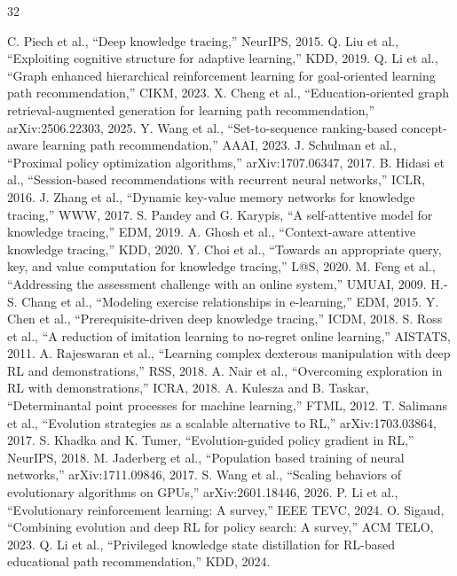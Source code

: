 \documentclass[11pt,a4paper]{article}
\begin{document}

\begin{thebibliography}{32}

 C. Piech et al., ``Deep knowledge tracing,'' NeurIPS, 2015.
 Q. Liu et al., ``Exploiting cognitive structure for adaptive learning,'' KDD, 2019.
 Q. Li et al., ``Graph enhanced hierarchical reinforcement learning for goal-oriented learning path recommendation,'' CIKM, 2023.
 X. Cheng et al., ``Education-oriented graph retrieval-augmented generation for learning path recommendation,'' arXiv:2506.22303, 2025.
 Y. Wang et al., ``Set-to-sequence ranking-based concept-aware learning path recommendation,'' AAAI, 2023.
 J. Schulman et al., ``Proximal policy optimization algorithms,'' arXiv:1707.06347, 2017.
 B. Hidasi et al., ``Session-based recommendations with recurrent neural networks,'' ICLR, 2016.
 J. Zhang et al., ``Dynamic key-value memory networks for knowledge tracing,'' WWW, 2017.
 S. Pandey and G. Karypis, ``A self-attentive model for knowledge tracing,'' EDM, 2019.
 A. Ghosh et al., ``Context-aware attentive knowledge tracing,'' KDD, 2020.
 Y. Choi et al., ``Towards an appropriate query, key, and value computation for knowledge tracing,'' L@S, 2020.
 M. Feng et al., ``Addressing the assessment challenge with an online system,'' UMUAI, 2009.
 H.-S. Chang et al., ``Modeling exercise relationships in e-learning,'' EDM, 2015.
 Y. Chen et al., ``Prerequisite-driven deep knowledge tracing,'' ICDM, 2018.
 S. Ross et al., ``A reduction of imitation learning to no-regret online learning,'' AISTATS, 2011.
 A. Rajeswaran et al., ``Learning complex dexterous manipulation with deep RL and demonstrations,'' RSS, 2018.
 A. Nair et al., ``Overcoming exploration in RL with demonstrations,'' ICRA, 2018.
 A. Kulesza and B. Taskar, ``Determinantal point processes for machine learning,'' FTML, 2012.
 T. Salimans et al., ``Evolution strategies as a scalable alternative to RL,'' arXiv:1703.03864, 2017.
 S. Khadka and K. Tumer, ``Evolution-guided policy gradient in RL,'' NeurIPS, 2018.
 M. Jaderberg et al., ``Population based training of neural networks,'' arXiv:1711.09846, 2017.
 S. Wang et al., ``Scaling behaviors of evolutionary algorithms on GPUs,'' arXiv:2601.18446, 2026.
 P. Li et al., ``Evolutionary reinforcement learning: A survey,'' IEEE TEVC, 2024.
 O. Sigaud, ``Combining evolution and deep RL for policy search: A survey,'' ACM TELO, 2023.
 Q. Li et al., ``Privileged knowledge state distillation for RL-based educational path recommendation,'' KDD, 2024.

\end{thebibliography}
\end{document}

